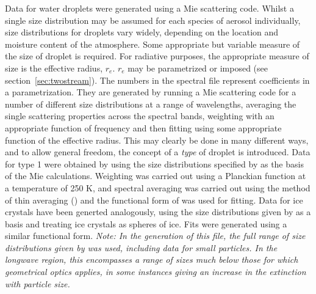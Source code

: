 \begin{enumerate}
Data for water droplets were generated using a Mie scattering code. 
Whilst a single size distribution may be assumed for each species
of aerosol individually, size distributions for droplets vary widely,
depending on the location and moisture content of the atmosphere. Some
appropriate but variable measure of the size of droplet is required.
For radiative purposes, the
appropriate measure of size is the effective radius, $r_e$. $r_e$
may be parametrized or imposed (see section~\ref{sec:twostream}). The numbers in the
spectral file represent coefficients in a parametrization. They
are generated by running a Mie scattering code for a number of different
size distributions at a range of wavelengths, averaging the single
scattering properties across the spectral bands, weighting with an
appropriate function of frequency and then fitting using some appropriate
function of the effective radius. This may clearly be done in many
different ways, and to allow general freedom, the concept of a {\em
type} of droplet is introduced.  Data for type 1 were obtained by
using the size distributions specified by \citet{Rockel91} 
as the basis of the Mie calculations. Weighting
was carried out using a Planckian function at a temperature of 250 K,
and spectral averaging was carried out using the method of 
thin averaging (\citet{Edwards96rc}) and
the functional form of \citet{Slingo82} was used for fitting. 
Data for ice crystals have been generted analogously, using the 
size distributions given by \citet{Rockel91} 
as a basis and treating ice crystals
as spheres of ice. Fits were generated using a similar functional form.
{\em Note: In the generation of this file, the full range of size 
distributions given by \citet{Rockel91} was used, including data for 
small particles. In the longwave region, this encompasses a range of
sizes much below those for which geometrical optics applies, in some
instances giving an increase in the extinction with particle size.}

\end{enumerate}
